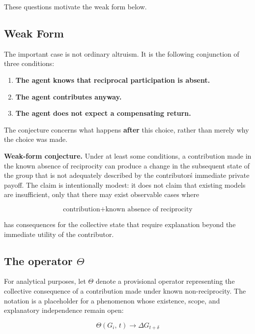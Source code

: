 \documentclass[10pt,twocolumn]{article}
\begin{document}
These questions motivate the weak form below.

\subsection*{Weak Form}

The important case is not ordinary altruism. It is the following conjunction of three conditions:

\begin{enumerate}
    \item \textbf{The agent knows that reciprocal participation is absent.}
    \item \textbf{The agent contributes anyway.}
    \item \textbf{The agent does not expect a compensating return.}
\end{enumerate}

The conjecture concerns what happens \textbf{after} this choice, rather than merely why the choice was made.

\medskip
\noindent\textbf{Weak-form conjecture.} Under at least some conditions, a contribution made in the known absence of reciprocity can produce a change in the subsequent state of the group that is not adequately described by the contributor\'s immediate private payoff. The claim is intentionally modest: it does not claim that existing models are insufficient, only that there may exist observable cases where

\begin{equation}
\text{contribution} + \text{known absence of reciprocity}
\end{equation}

has consequences for the collective state that require explanation beyond the immediate utility of the contributor.

\subsection*{The operator $\Theta$}

For analytical purposes, let $\Theta$ denote a provisional operator representing the collective consequence of a contribution made under known non-reciprocity. The notation is a placeholder for a phenomenon whose existence, scope, and explanatory independence remain open:

\begin{equation}
\Theta(G_i,\,t) \rightarrow \Delta G_{t+\delta}
\end{equation}
\end{document}
